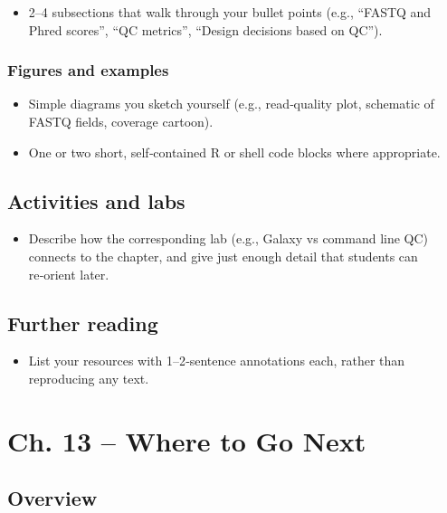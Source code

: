\documentclass[
  letterpaper,
  DIV=11,
  numbers=noendperiod]{scrreprt}
\providecommand{\tightlist}{%
  \setlength{\itemsep}{0pt}\setlength{\parskip}{0pt}}
\begin{document}
\begin{itemize}
\tightlist
\item
  2--4 subsections that walk through your bullet points (e.g., ``FASTQ
  and Phred scores'', ``QC metrics'', ``Design decisions based on QC'').
\end{itemize}

\subsection{Figures and examples}\label{figures-and-examples-8}

\begin{itemize}
\tightlist
\item
  Simple diagrams you sketch yourself (e.g., read‑quality plot,
  schematic of FASTQ fields, coverage cartoon).
\item
  One or two short, self‑contained R or shell code blocks where
  appropriate.
\end{itemize}

\section{Activities and labs}\label{activities-and-labs-8}

\begin{itemize}
\tightlist
\item
  Describe how the corresponding lab (e.g., Galaxy vs command line QC)
  connects to the chapter, and give just enough detail that students can
  re‑orient later.
\end{itemize}

\section{Further reading}\label{further-reading-8}

\begin{itemize}
\tightlist
\item
  List your resources with 1--2‑sentence annotations each, rather than
  reproducing any text.
\end{itemize}


\chapter{Ch. 13 -- Where to Go Next}\label{ch.-13-where-to-go-next}

\section{Overview}\label{overview-9}
\end{document}
